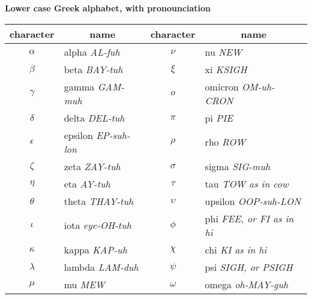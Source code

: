 \begin{center}
  \textbf{Lower case Greek alphabet, with pronounciation}
    \\[1ex]
  \newcommand{\pronounced}[1]{\hspace*{.2em}\small\textit{#1}}
  \begin{tabular}{cl@{\hspace*{3em}}cl}
    character &\multicolumn{1}{c}{name}       
    &character  &\multicolumn{1}{c}{name}  \\ 
    \hline
     \( \alpha  \) &alpha \pronounced{AL-fuh}  
       &\( \nu     \)  &nu  \pronounced{NEW}       \\
     \( \beta   \) &beta  \pronounced{BAY-tuh}     
       &\( \xi  \)  &xi   \pronounced{KSIGH}    \\ 
     \( \gamma  \) &gamma  \pronounced{GAM-muh}    
       &\( o       \) &omicron  \pronounced{OM-uh-CRON}  \\
     \( \delta  \) &delta  \pronounced{DEL-tuh}   
       &\( \pi \) &pi  \pronounced{PIE}     \\
     \( \epsilon\) &epsilon  \pronounced{EP-suh-lon}   
       &\( \rho \) &rho  \pronounced{ROW}    \\
     \( \zeta   \) &zeta   \pronounced{ZAY-tuh}    
       &\( \sigma  \) &sigma  \pronounced{SIG-muh}  \\
     \( \eta    \) &eta  \pronounced{AY-tuh}      
       &\( \tau \) &tau  \pronounced{TOW as in cow}    \\
     \( \theta  \) &theta  \pronounced{THAY-tuh}    
       &\( \upsilon\) &upsilon  \pronounced{OOP-suh-LON}  \\
     \( \iota \) &iota \pronounced{eye-OH-tuh}   
       &\( \phi    \) &phi  \pronounced{FEE, or FI as in hi}    \\
     \( \kappa  \) &kappa  \pronounced{KAP-uh}  
       &\( \chi    \) &chi  \pronounced{KI as in hi}    \\
     \( \lambda \) &lambda  \pronounced{LAM-duh}  
       &\( \psi    \) &psi \pronounced{SIGH, or PSIGH}    \\
     \( \mu  \)  &mu  \pronounced{MEW}     
       &\( \omega  \) &omega  \pronounced{oh-MAY-guh}  
  \end{tabular}
\end{center}
\vfill
\par{}
%
